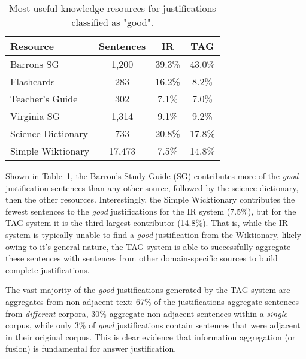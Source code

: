 %
%
\begin{table}[t]
\small
\begin{center}
\begin{tabular}{lccc}
\hline
\multicolumn{1}{l}{Resource} & \multicolumn{1}{c}{Sentences} &\multicolumn{1}{c}{IR} & \multicolumn{1}{c}{TAG}  \\
\cline{2-3}
\hline
Barrons SG 			& 1,200		&	39.3\%		& 43.0\%	\\
Flashcards			& 283		&	16.2\%		& 8.2\%	\\
Teacher's Guide		& 302		&	7.1\%		& 7.0\%	\\
Virginia SG			& 1,314		&	9.1\%		& 9.2\%	\\
Science Dictionary	& 733		&	20.8\%		& 17.8\%	\\
Simple Wiktionary	& 17,473		&	7.5\%		& 14.8\%	\\

\end{tabular}
\caption{{ Most useful knowledge resources for justifications classified as "good".}}

\label{tab:justificationknowledgeresources}
\end{center}
\end{table}

{} Shown in Table~\ref{tab:justificationknowledgeresources}, the Barron's Study Guide (SG) contributes more of the \emph{good} justification sentences than any other source, followed by the science dictionary, then the other resources.  Interestingly, the Simple Wicktionary contributes the fewest sentences to the \emph{good} justifications for the IR system (7.5\%), but for the TAG system it is the third largest contributor (14.8\%).  That is, while the IR system is typically unable to find a \emph{good} justification from the Wiktionary, likely owing to it's general nature, the TAG system is able to successfully aggregate these sentences with sentences from other domain-specific sources to build complete justifications.

The vast majority of the \emph{good} justifications generated by the TAG system are aggregates from non-adjacent text: 67\% of the justifications aggregate sentences from \emph{different} corpora, 30\% aggregate non-adjacent sentences within a \emph{single} corpus, while only 3\% of \emph{good} justifications contain sentences that were adjacent in their original corpus. 
This is clear evidence that information aggregation (or fusion) is fundamental for answer justification.


